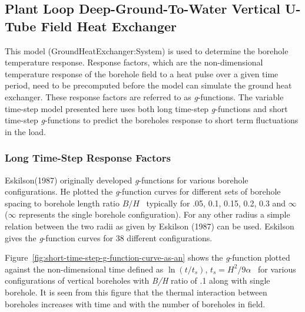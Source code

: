 \subsection{Plant Loop Deep-Ground-To-Water Vertical U-Tube Field Heat Exchanger}\label{plant-loop-deep-ground-to-water-vertical-u-tube-field-heat-exchanger}

This model (GroundHeatExchanger:System) is used to determine the borehole temperature response. Response factors, which are the non-dimensional temperature response of the borehole field to a heat pulse over a given time period, need to be precomputed before the model can simulate the ground heat exchanger. These response factors are referred to as \emph{g}-functions. The variable time-step model presented here uses both long time-step \emph{g}-functions and short time-step \emph{g}-functions to predict the boreholes response to short term fluctuations in the load.

\subsubsection{Long Time-Step Response Factors}\label{long-time-step-response-factors}

Eskilson(1987) originally developed \emph{g}-functions for various borehole configurations. He plotted the \emph{g}-function curves for different sets of borehole spacing to borehole length ratio \(B/H\) ~typically for .05, 0.1, 0.15, 0.2, 0.3 and \(\infty\) (\(\infty\) represents the single borehole configuration). For any other radius a simple relation between the two radii as given by Eskilson (1987) can be used. Eskilson gives the \emph{g}-function curves for 38 different configurations.

Figure~\ref{fig:short-time-step-g-function-curve-as-an} shows the \emph{g}-function plotted against the non-dimensional time defined as \(\ln (t/{t_s})\), \({t_s} = {H^2}/9\alpha\) ~for various configurations of vertical boreholes with \emph{B/H} ratio of .1 along with single borehole. It is seen from this figure that the thermal interaction between boreholes increases with time and with the number of boreholes in field.


